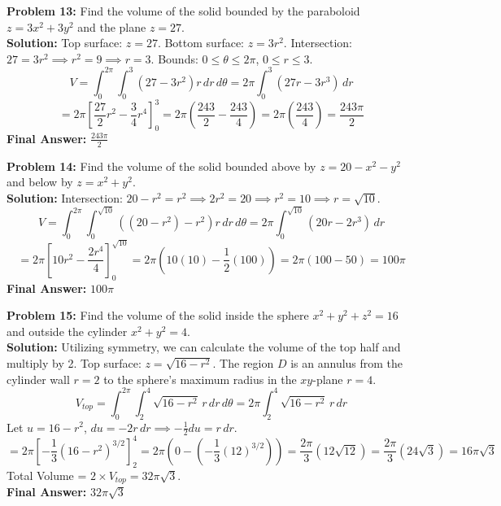 \documentclass[11pt]{article}
\begin{document}
\vspace{0.5cm}
\textbf{Problem 13:} Find the volume of the solid bounded by the paraboloid $z = 3x^2+3y^2$ and the plane $z = 27$.
\\
\textbf{Solution:}
Top surface: $z=27$. Bottom surface: $z=3r^2$.
Intersection: $27 = 3r^2 \implies r^2 = 9 \implies r = 3$.
Bounds: $0 \le \theta \le 2\pi$, $0 \le r \le 3$.
$$ V = \int_0^{2\pi} \int_0^3 (27 - 3r^2)r \, dr \, d\theta = 2\pi \int_0^3 (27r - 3r^3) \, dr $$
$$ = 2\pi \left[ \frac{27}{2}r^2 - \frac{3}{4}r^4 \right]_0^3 = 2\pi \left( \frac{243}{2} - \frac{243}{4} \right) = 2\pi \left( \frac{243}{4} \right) = \frac{243\pi}{2} $$
\textbf{Final Answer:} $\frac{243\pi}{2}$

\vspace{0.5cm}
\textbf{Problem 14:} Find the volume of the solid bounded above by $z = 20 - x^2 - y^2$ and below by $z = x^2+y^2$.
\\
\textbf{Solution:}
Intersection: $20 - r^2 = r^2 \implies 2r^2 = 20 \implies r^2 = 10 \implies r = \sqrt{10}$.
$$ V = \int_0^{2\pi} \int_0^{\sqrt{10}} \left( (20 - r^2) - r^2 \right) r \, dr \, d\theta = 2\pi \int_0^{\sqrt{10}} (20r - 2r^3) \, dr $$
$$ = 2\pi \left[ 10r^2 - \frac{2r^4}{4} \right]_0^{\sqrt{10}} = 2\pi \left( 10(10) - \frac{1}{2}(100) \right) = 2\pi (100 - 50) = 100\pi $$
\textbf{Final Answer:} $100\pi$

\vspace{0.5cm}
\textbf{Problem 15:} Find the volume of the solid inside the sphere $x^2+y^2+z^2=16$ and outside the cylinder $x^2+y^2=4$.
\\
\textbf{Solution:}
Utilizing symmetry, we can calculate the volume of the top half and multiply by 2.
Top surface: $z = \sqrt{16-r^2}$. The region $D$ is an annulus from the cylinder wall $r=2$ to the sphere's maximum radius in the $xy$-plane $r=4$.
$$ V_{top} = \int_0^{2\pi} \int_2^4 \sqrt{16-r^2} \, r \, dr \, d\theta = 2\pi \int_2^4 \sqrt{16-r^2} \, r \, dr $$
Let $u = 16-r^2$, $du = -2r \, dr \implies -\frac{1}{2}du = r \, dr$. 
$$ = 2\pi \left[ -\frac{1}{3}(16-r^2)^{3/2} \right]_2^4 = 2\pi \left( 0 - \left(-\frac{1}{3}(12)^{3/2}\right) \right) = \frac{2\pi}{3} (12\sqrt{12}) = \frac{2\pi}{3} (24\sqrt{3}) = 16\pi\sqrt{3} $$
Total Volume = $2 \times V_{top} = 32\pi\sqrt{3}$.
\\
\textbf{Final Answer:} $32\pi\sqrt{3}$
\end{document}
